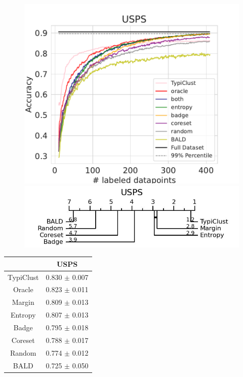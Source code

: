 \documentclass[]{article}
\begin{document}
\begin{minipage}{0.65\linewidth}
\begin{figure}[H]
    \centering
	\includegraphics[width=\linewidth]{img/eval_usps} \\ [2mm]
	\includegraphics[width=\linewidth]{img/micro_usps.jpg}
\end{figure}
\end{minipage}
\begin{minipage}{0.29\linewidth}
\begin{tabular}{c|c}
&USPS\\
\hline
TypiClust&0.830 $\pm$ 0.007\\
Oracle&0.823 $\pm$ 0.011\\
Margin&0.809 $\pm$ 0.013\\
Entropy&0.807 $\pm$ 0.013\\
Badge&0.795 $\pm$ 0.018\\
Coreset&0.788 $\pm$ 0.017\\
Random&0.774 $\pm$ 0.012\\
BALD&0.725 $\pm$ 0.050\\
\end{tabular}
\end{minipage}
\end{document}

